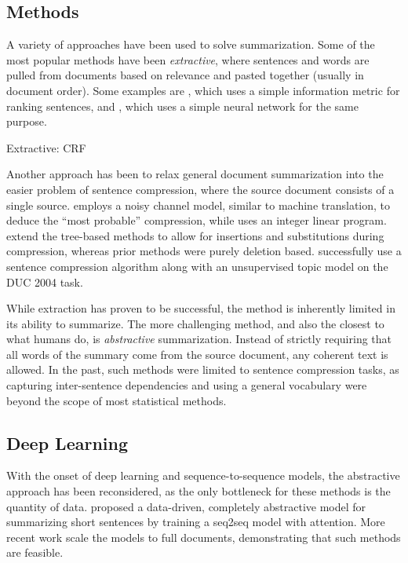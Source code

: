 \documentclass[11pt]{report}
\begin{document}
\subsection{Methods}

A variety of approaches have been used to solve summarization. Some of the most popular methods have been \emph{extractive}, where sentences and words are pulled from documents based on relevance and pasted together (usually in document order). Some examples are \cite{carbonell1998MMR}, which uses a simple information metric for ranking sentences, and \cite{svore2007ranknet}, which uses a simple neural network for the same purpose.

Extractive: CRF \cite{Shen2004}

Another approach has been to relax general document summarization into the easier problem of sentence compression, where the source document consists of a single source. \cite{knight2002summarization} employs a noisy channel model, similar to machine translation, to deduce the ``most probable'' compression, while \cite{clarke2008global} uses an integer linear program. \cite{cohn2008sentence} extend the tree-based methods to allow for insertions and substitutions during compression, whereas prior methods were purely deletion based. \cite{zajic2004topiary} successfully use a sentence compression algorithm along with an unsupervised topic model on the DUC 2004 task.

While extraction has proven to be successful, the method is inherently limited in its ability to summarize. The more challenging method, and also the closest to what humans do, is \emph{abstractive} summarization. Instead of strictly requiring that all words of the summary come from the source document, any coherent text is allowed. In the past, such methods were limited to sentence compression tasks, as capturing inter-sentence dependencies and using a general vocabulary were beyond the scope of most statistical methods.

\subsection{Deep Learning}

With the onset of deep learning and sequence-to-sequence models, the abstractive approach has been reconsidered, as the only bottleneck for these methods is the quantity of data. \cite{rush2015neural} proposed a data-driven, completely abstractive model for summarizing short sentences by training a seq2seq model with attention. More recent work \citep{nallapati2016seq2seq, ramachandran2016} scale the models to full documents, demonstrating that such methods are feasible.
\end{document}
